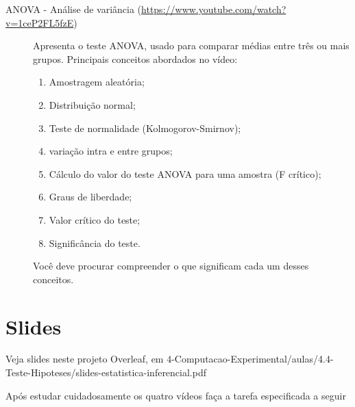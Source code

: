 \begin{description}
\item [ANOVA - Análise de variância (\url{https://www.youtube.com/watch?v=1ceP2FL5fzE})] Apresenta o teste ANOVA, usado para comparar médias entre três ou mais grupos.
Principais conceitos abordados no vídeo:
\begin{enumerate}
    \item Amostragem aleatória;
    \item Distribuição normal;
    \item Teste de normalidade (Kolmogorov-Smirnov);
    \item variação intra e entre grupos;
    \item Cálculo do valor do teste ANOVA para uma amostra (F crítico);
    \item Graus de liberdade;
    \item Valor crítico do teste;
    \item Significância do teste.
\end{enumerate}
Você deve procurar compreender o que significam cada um desses conceitos.

\end{description}

\section{Slides}

Veja slides neste projeto Overleaf, em 
4-Computacao-Experimental/aulas/4.4-Teste-Hipoteses/slides-estatistica-inferencial.pdf




Após estudar cuidadosamente os quatro vídeos faça a tarefa especificada a seguir

